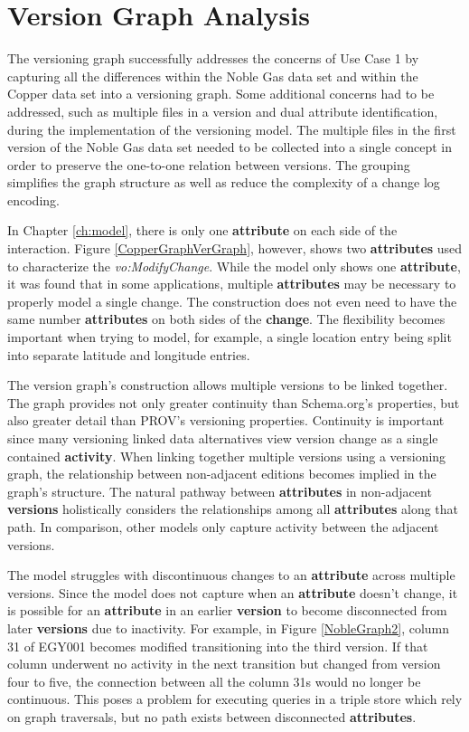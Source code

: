 \section{Version Graph Analysis}

The versioning graph successfully addresses the concerns of Use Case 1 by capturing all the differences within the Noble Gas data set and within the Copper data set into a versioning graph.
Some additional concerns had to be addressed, such as multiple files in a version and dual attribute identification, during the implementation of the versioning model.
The multiple files in the first version of the Noble Gas data set needed to be collected into a single concept in order to preserve the one-to-one relation between versions.
The grouping simplifies the graph structure as well as reduce the complexity of a change log encoding.

In Chapter \ref{ch:model}, there is only one \textbf{attribute} on each side of the interaction.
Figure \ref{CopperGraphVerGraph}, however, shows two \textbf{attributes} used to characterize the \textit{vo:ModifyChange}.
While the model only shows one \textbf{attribute}, it was found that in some applications, multiple \textbf{attributes} may be necessary to properly model a single change.
The construction does not even need to have the same number \textbf{attributes} on both sides of the \textbf{change}.
The flexibility becomes important when trying to model, for example, a single location entry being split into separate latitude and longitude entries.

The version graph's construction allows multiple versions to be linked together.
The graph provides not only greater continuity than Schema.org's properties, but also greater detail than PROV's versioning properties.
Continuity is important since many versioning linked data alternatives view version change as a single contained \textbf{activity}.
When linking together multiple versions using a versioning graph, the relationship between non-adjacent editions becomes implied in the graph's structure.
The natural pathway between \textbf{attributes} in non-adjacent \textbf{versions} holistically considers the relationships among all \textbf{attributes} along that path.
In comparison, other models only capture activity between the adjacent versions.

The model struggles with discontinuous changes to an \textbf{attribute} across multiple versions.
Since the model does not capture when an \textbf{attribute} doesn't change, it is possible for an \textbf{attribute} in an earlier \textbf{version} to become disconnected from later \textbf{versions} due to inactivity.
For example, in Figure \ref{NobleGraph2}, column 31 of EGY001 becomes modified transitioning into the third version.
If that column underwent no activity in the next transition but changed from version four to five, the connection between all the column 31s would no longer be continuous.
This poses a problem for executing queries in a triple store which rely on graph traversals, but no path exists between disconnected \textbf{attributes}.

